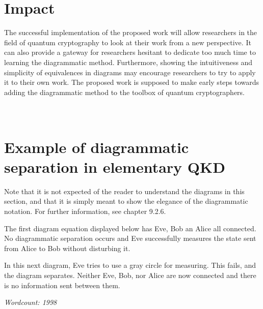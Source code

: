 \documentclass[%
 reprint,
nofootinbib,
 amsmath,amssymb,
 aps,
]{revtex4-2}
\begin{document}
\section{Impact}

The successful implementation of the proposed work will allow researchers in the field of quantum cryptography to look at their work from a new perspective. It can also provide a gateway for researchers hesitant to dedicate too much time to learning the diagrammatic method. Furthermore, showing the intuitiveness and simplicity of equivalences in diagrams may encourage researchers to try to apply it to their own work. The proposed work is supposed to make early steps towards adding the diagrammatic method to the toolbox of quantum cryptographers. 

\clearpage



\appendix
\section{\\Example of diagrammatic separation in elementary QKD}
\label{appendix:diagram}

Note that it is not expected of the reader to understand the diagrams in this section, and that it is simply meant to show the elegance of the diagrammatic notation. For further information, see \cite{Coecke2017} chapter 9.2.6.

The first diagram equation displayed below has Eve, Bob an Alice all connected. No diagrammatic separation occurs and Eve successfully measures the state sent from Alice to Bob without disturbing it.


In this next diagram, Eve tries to use a gray circle for measuring. This fails, and the diagram separates. Neither Eve, Bob, nor Alice are now connected and there is no information sent between them.


\textit{Wordcount: 1998}

\clearpage
\end{document}
